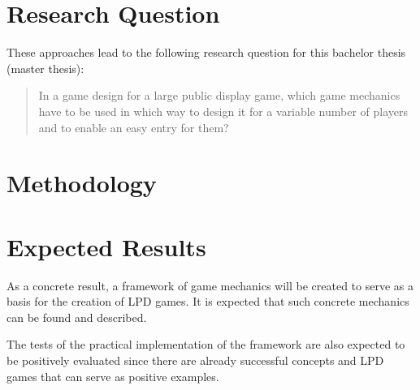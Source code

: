 \section{Research Question}

These approaches lead to the following research question for this bachelor
thesis (master thesis):
%
\begin{quote}
	In a game design for a large public display game, which game mechanics have
	to be used in which way to design it for a variable number of players and to
	enable an easy entry for them?
\end{quote}


\section{Methodology}

\iffalse
To answer this question, the bachelor thesis (master thesis) will be realized
as a combination of literature work and practical or prototypical
implementation.

First, the existing literature (extending section \ref{sec:state-of-the-art})
will show how the topic of smooth transition gameplay is dealt with from a
game design perspective. Common factors such as mechanics will be extracted
from this and serve as the basis for a theoretical framework. This framework
will contain a list of core mechanics and guidelines for their application so
that LPD games allow easy entry and a variable number of players.

The applicability of this framework will be tested by an own LPD game developed
during the term project. By asking simple qualitative questions to the players
and observing the visitors during several test runs, it will be determined
whether smooth transition gameplay could be achieved with the mechanics used.
\fi

\section{Expected Results}

As a concrete result, a framework of game mechanics will be created to serve as
a basis for the creation of LPD games. It is expected that such concrete
mechanics can be found and described.

The tests of the practical implementation of the framework are also expected to
be positively evaluated since there are already successful concepts and LPD
games that can serve as positive examples.

